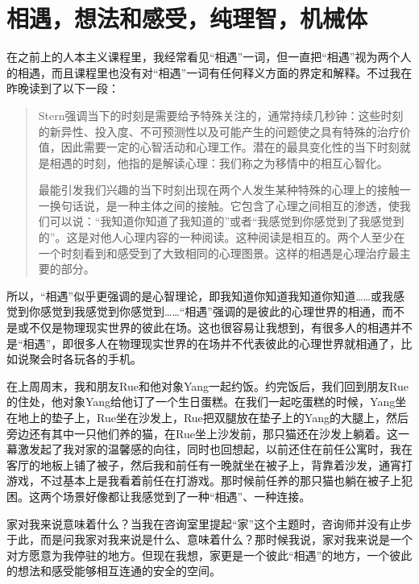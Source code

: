 \chapter{相遇，想法和感受，纯理智，机械体}






在之前上的人本主义课程里，我经常看见“相遇”一词，但一直把“相遇”视为两个人的相遇，而且课程里也没有对“相遇”一词有任何释义方面的界定和解释。不过我在昨晚读到了以下一段：

\blockquote{
	Stern强调当下的时刻是需要给予特殊关注的，通常持续几秒钟：这些时刻的新异性、投入度、不可预测性以及可能产生的问题使之具有特殊的治疗价值，因此需要一定的心智活动和心理工作。潜在的最具变化性的当下时刻就是相遇的时刻，他指的是解读心理：我们称之为移情中的相互心智化。

	最能引发我们兴趣的当下时刻出现在两个人发生某种特殊的心理上的接触一一换句话说，是一种主体之间的接触。它包含了心理之间相互的渗透，使我们可以说：“我知道你知道了我知道的”或者“我感觉到你感觉到了我感觉到的”。这是对他人心理内容的一种阅读。这种阅读是相互的。两个人至少在一个时刻看到和感受到了大致相同的心理图景。这样的相遇是心理治疗最主要的部分。

}

所以，“相遇”似乎更强调的是心智理论，即我知道你知道我知道你知道……或我感觉到你感觉到我感觉到你感觉到……“相遇”强调的是彼此的心理世界的相通，而不是或不仅是物理现实世界的彼此在场。这也很容易让我想到，有很多人的相遇并不是“相遇”，即很多人在物理现实世界的在场并不代表彼此的心理世界就相通了，比如说聚会时各玩各的手机。

在上周周末，我和朋友Rue和他对象Yang一起约饭。约完饭后，我们回到朋友Rue的住处，他对象Yang给他订了一个生日蛋糕。在我们一起吃蛋糕的时候，Yang坐在地上的垫子上，Rue坐在沙发上，Rue把双腿放在垫子上的Yang的大腿上，然后旁边还有其中一只他们养的猫，在Rue坐上沙发前，那只猫还在沙发上躺着。这一幕激发起了我对家的温馨感的向往，同时也回想起，以前还住在前任公寓时，我在客厅的地板上铺了被子，然后我和前任有一晚就坐在被子上，背靠着沙发，通宵打游戏，不过基本上是我看着前任在打游戏。那时候前任养的那只猫也躺在被子上犯困。这两个场景好像都让我感觉到了一种“相遇”、一种连接。

家对我来说意味着什么？当我在咨询室里提起“家”这个主题时，咨询师并没有止步于此，而是问我家对我来说是什么、意味着什么？那时候我说，家对我来说是一个对方愿意为我停驻的地方。但现在我想，家更是一个彼此“相遇”的地方，一个彼此的想法和感受能够相互连通的安全的空间。

